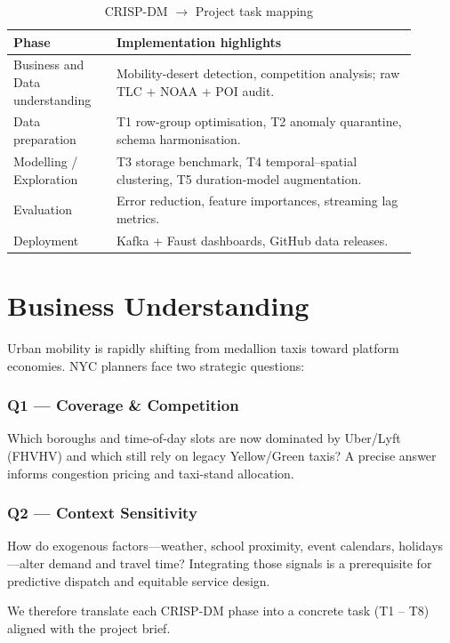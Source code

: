 \documentclass[conference]{IEEEtran}
\begin{document}
\begin{table}[htbp]
  \caption{CRISP-DM \(\to\) Project task mapping}
  \label{tab:crisp}
  \centering
  \begin{tabular}{p{0.23\linewidth}p{0.67\linewidth}}
    \toprule
    \textbf{Phase} & \textbf{Implementation highlights} \\ \midrule
    Business and Data understanding &
    Mobility-desert detection, competition analysis; raw TLC + NOAA + POI audit.\\
    Data preparation &
    T1 row-group optimisation, T2 anomaly quarantine, schema harmonisation.\\
    Modelling / Exploration &
    T3 storage benchmark, T4 temporal–spatial clustering,
    T5 duration-model augmentation.\\
    Evaluation &
    Error reduction, feature importances,
    streaming lag metrics.\\
    Deployment &
    Kafka + Faust dashboards, GitHub data releases.\\
    \bottomrule
  \end{tabular}
\end{table}

\section{Business Understanding}
Urban mobility is rapidly shifting from medallion taxis toward platform
economies.  NYC planners face two strategic questions:

\subsubsection*{Q1 — Coverage \& Competition}
Which boroughs and time-of-day slots are now dominated by Uber/Lyft
(FHVHV) and which still rely on legacy Yellow/Green taxis?  A precise
answer informs congestion pricing and taxi-stand allocation.

\subsubsection*{Q2 — Context Sensitivity}
How do exogenous factors—weather, school proximity, event calendars, holidays—alter demand and travel time?
Integrating those signals is a prerequisite for predictive dispatch and equitable service design.

We therefore translate each CRISP-DM phase into a concrete task
(T1 – T8) aligned with the project brief.
\end{document}
